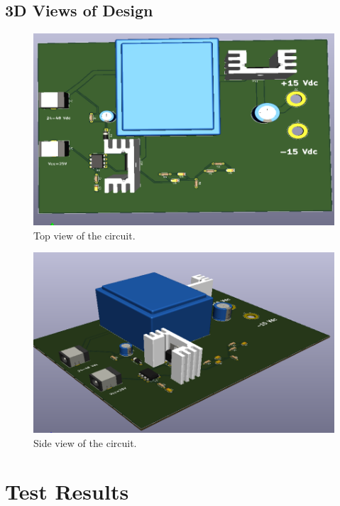 \documentclass{article}
\begin{document}
\subsection{3D Views of Design}

\begin{figure}[H]
    \centering
    \includegraphics[scale=0.8]{PCB10.png}
    \caption{Top view of the circuit. }
    \label{fig:my_label}
\end{figure}

\begin{figure}[H]
    \centering
    \includegraphics[scale=0.8]{PCB11.png}
    \caption{Side view of the circuit. }
    \label{fig:my_label}
\end{figure}








\section{Test Results }
\end{document}
